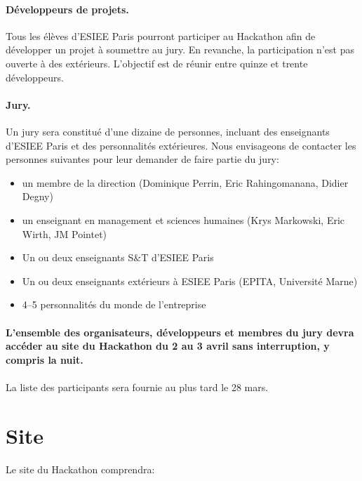 \documentclass{article}
\begin{document}
\paragraph{Développeurs de projets.} Tous les  élèves d'ESIEE Paris pourront
participer au Hackathon afin de développer un projet à soumettre au jury. En
revanche, la participation n'est pas ouverte à des extérieurs. L'objectif est
de réunir entre quinze et trente développeurs.

\paragraph{Jury.} Un jury sera constitué d'une dizaine de personnes, incluant
des enseignants d'ESIEE Paris et des personnalités extérieures.  Nous
envisageons de contacter les personnes suivantes pour leur demander de faire
partie du jury:

\begin{itemize}
  \item un membre de la direction (Dominique Perrin, Eric Rahingomanana, Didier
	  Degny)
  \item un enseignant en management et sciences humaines (Krys Markowski, Eric
	  Wirth, JM Pointet)
  \item Un ou deux enseignants S\&T d'ESIEE Paris
  \item Un ou deux enseignants extérieurs à ESIEE Paris (EPITA, Université
	  Marne)
  \item 4--5 personnalités du monde de l'entreprise
\end{itemize}

\paragraph{}
\textbf{L'ensemble des organisateurs, développeurs et membres du jury devra
	accéder au site du Hackathon du 2 au 3 avril sans interruption, y compris
	la nuit.}

\paragraph{}
La liste des participants sera fournie au plus tard le 28 mars.

\section{Site}

\paragraph{}
Le site du Hackathon comprendra:
\end{document}
